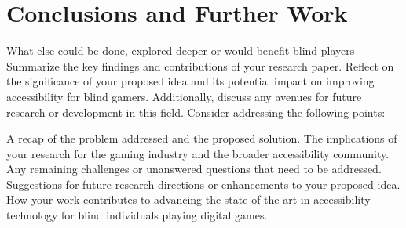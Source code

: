 \documentclass[sigconf,natbib=false,9pt]{acmart}
\begin{document}
	\section{Conclusions and Further Work}
	What else could be done, explored deeper or would benefit blind players
	Summarize the key findings and contributions of your research paper. Reflect on the significance of your proposed idea and its potential impact on improving accessibility for blind gamers. Additionally, discuss any avenues for future research or development in this field. Consider addressing the following points:
	
	A recap of the problem addressed and the proposed solution.
	The implications of your research for the gaming industry and the broader accessibility community.
	Any remaining challenges or unanswered questions that need to be addressed.
	Suggestions for future research directions or enhancements to your proposed idea.
	How your work contributes to advancing the state-of-the-art in accessibility technology for blind individuals playing digital games.
	
	
	\printbibliography
	
\end{document}
